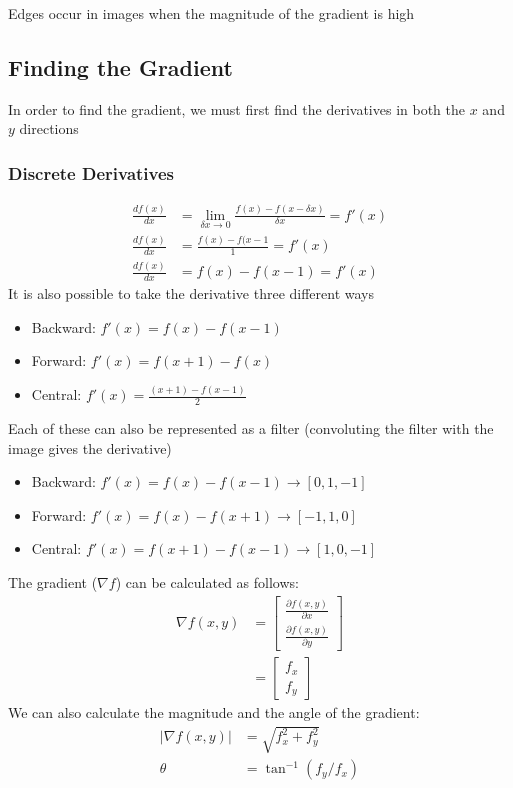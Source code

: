 \documentclass{article}
\begin{document}
Edges occur in images when the magnitude of the gradient is high
\subsection{Finding the Gradient}
In order to find the gradient, we must first find the derivatives in both the $x$ and $y$ directions
\subsubsection{Discrete Derivatives}
\begin{align*}
\frac{df(x)}{dx} &= \lim_{\delta x\rightarrow0}\frac{f(x)-f(x-\delta x)}{\delta x} = f'(x)\\
\frac{df(x)}{dx} &= \frac{f(x)-f(x-1}{1} = f'(x)\\
\frac{df(x)}{dx} &= f(x)-f(x-1) = f'(x)
\end{align*}
It is also possible to take the derivative three different ways
\begin{itemize}
\item Backward: $f'(x) = f(x)-f(x-1)$
\item Forward: $f'(x) = f(x+1)-f(x)$
\item Central: $f'(x) = \frac{(x+1)-f(x-1)}{2}$
\end{itemize}
Each of these can also be represented as a filter (convoluting the filter with the image gives the derivative)
\begin{itemize}
\item Backward: $f'(x) = f(x)-f(x-1)\rightarrow[0,1,-1]$
\item Forward: $f'(x) = f(x)-f(x+1)\rightarrow[-1,1,0]$
\item Central: $f'(x) = f(x+1)-f(x-1)\rightarrow[1,0,-1]$
\end{itemize}
The gradient ($\nabla f$) can be calculated as follows:
\begin{align*}
\nabla f(x,y) &= \begin{bmatrix}%
    \frac{\partial f(x,y)}{\partial x}\\
    \frac{\partial f(x,y)}{\partial y}
    \end{bmatrix}\\
    &= \begin{bmatrix}%
    f_x\\
    f_y
    \end{bmatrix}
\end{align*}
We can also calculate the magnitude and the angle of the gradient:
\begin{align*}
|\nabla f(x,y)| &= \sqrt{f_x^2+f_y^2}\\
\theta &= \tan^{-1}\left(f_y/f_x\right)
\end{align*}
\end{document}
